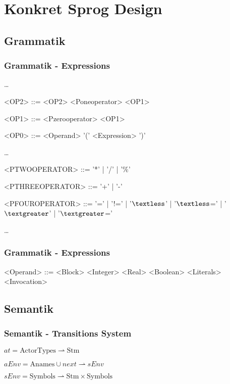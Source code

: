\section{Konkret Sprog Design}
\subsection{Grammatik}
\begin{frame}
	\frametitle{Grammatik - Expressions}
	\dots
	\begin{grammar}
	<OP2> ::= <OP2> <Poneoperator> <OP1>
  
	<OP1> ::= <Pzerooperator> <OP1>

  <OP0> ::= <Operand>
  \alt '(' <Expression> ')'
  \end{grammar}
	\dots
	\begin{grammar}
	<PTWOOPERATOR> ::= '*' | '/' | '\%'
	
	<PTHREEOPERATOR> ::= '+' | '-'
	
	<PFOUROPERATOR> ::= '=' | '!=' | '$\textless$' | '$\textless$=' | '$\textgreater$' | '$\textgreater$='
	\end{grammar}
	\dots
\end{frame}

\begin{frame}
	\frametitle{Grammatik - Expressions}
	\begin{grammar}
  <Operand> ::= <Block>
    \alt <Integer>
    \alt <Real>
    \alt <Boolean>
    \alt <Literals>
    \alt <Invocation>
  \end{grammar}
\end{frame}

\subsection{Semantik}
\begin{frame}
	\frametitle{Semantik - Transitions System}
	\begin{center}	
  $at = \text{ActorTypes} \rightharpoonup \text{Stm}$
	
	$aEnv = \text{Anames} \cup {next} \rightharpoonup sEnv$
	
	$sEnv = \text{Symbols} \rightharpoonup \text{Stm} \times \text{Symbols}$
  \end{center}
\end{frame}

